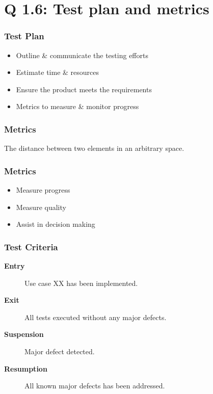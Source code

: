 
\section{Q 1.6: Test plan and metrics}

\begin{frame}
    \frametitle{Test Plan}
    \begin{itemize}
        \item Outline \& communicate the testing efforts
        \item Estimate time \& resources
        \item Ensure the product meets the requirements
        \item Metrics to measure \& monitor progress
    \end{itemize}
\end{frame}

\begin{frame}
    \frametitle{Metrics}
    The distance between two elements in an arbitrary space.
\end{frame}

\begin{frame}
    \frametitle{Metrics}
    \begin{itemize}
        \item Measure progress
        \item Measure quality
        \item Assist in decision making
    \end{itemize}
\end{frame}

\begin{frame}
    \frametitle{Test Criteria}
    \begin{description}
        \item[\textbf{Entry}] Use case XX has been implemented.
        \item[\textbf{Exit}] All tests executed without any major defects.
        \item[\textbf{Suspension}] Major defect detected.
        \item[\textbf{Resumption}] All known major defects has been addressed.
    \end{description}
\end{frame}


